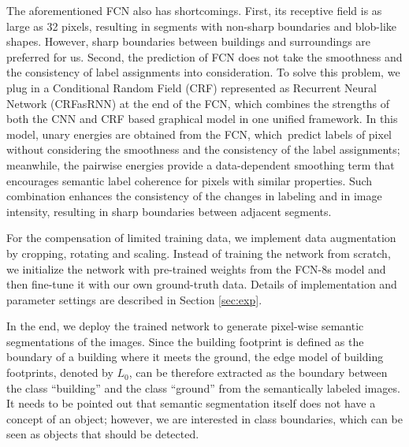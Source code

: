 The aforementioned FCN also has shortcomings. First, its receptive field is as large as 32 pixels, resulting in segments with non-sharp boundaries and blob-like shapes. However, sharp boundaries between buildings and surroundings are preferred for us. Second, the prediction of FCN does not take the smoothness and the consistency of label assignments into consideration. To solve this problem, we plug in a Conditional Random Field (CRF) represented as Recurrent Neural Network (CRFasRNN) \cite{crfasrnn_ICCV2015,higherordercrf_ECCV2016} at the end of the FCN, which combines the strengths of both the CNN and CRF based graphical model in one unified framework. In this model, unary energies are obtained from the FCN, which~predict labels of pixel without considering the smoothness and the consistency of the label assignments; meanwhile, the pairwise energies provide a data-dependent smoothing term that encourages semantic label coherence for pixels with similar properties. Such combination enhances the consistency of the changes in labeling and in image intensity, resulting in sharp boundaries between adjacent segments.

For the compensation of limited training data, we implement data augmentation by cropping, rotating and scaling. Instead of training the network from scratch, we initialize the network with pre-trained weights from the FCN-8s model and then fine-tune it with our own ground-truth data. Details of implementation and parameter settings are described in Section \ref{sec:exp}. 

In the end, we deploy the trained network to generate pixel-wise semantic segmentations of the images. Since the building footprint is defined as the boundary of a building where it meets the ground, the edge model of building footprints, denoted by $L_0$, can be therefore extracted as the boundary between the class ``building'' and the class ``ground'' from the semantically labeled images. It needs to be pointed out that semantic segmentation itself does not have a concept of an object; however, we are interested in class boundaries, which can be seen as objects that should be detected.


